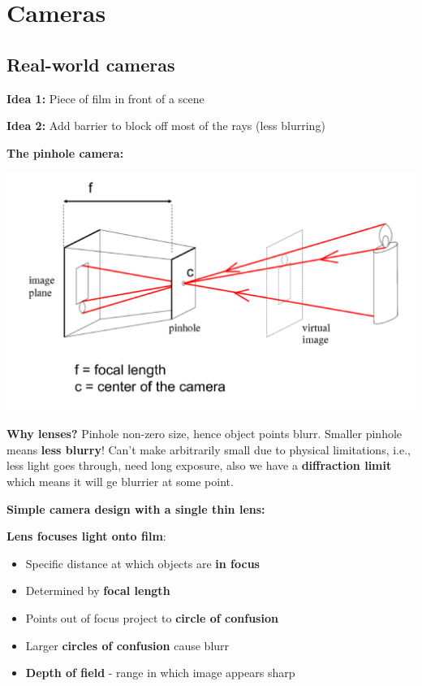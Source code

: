 \chapter{Cameras}

\section{Real-world cameras}

\textbf{Idea 1:} Piece of film in front of a scene

\textbf{Idea 2:} Add barrier to block off most of the rays (less blurring)

\textbf{The pinhole camera:} 

\includegraphics[width=\textwidth]{images/chap7/pinhole}

\textbf{Why lenses?} Pinhole non-zero size, hence object points blurr. Smaller pinhole means \textbf{less blurry}! Can't make arbitrarily small due to physical limitations, i.e., less light goes through, need long exposure, also we have a \textbf{diffraction limit} which means it will ge blurrier at some point.

\textbf{Simple camera design with a single thin lens:}

\textbf{Lens focuses light onto film}: \begin{itemize}
    \item Specific distance at which objects are \textbf{in focus}
    \item Determined by \textbf{focal length}
    \item Points out of focus project to \textbf{circle of confusion}
    \item Larger \textbf{circles of confusion} cause blurr
    \item \textbf{Depth of field} - range in which image appears sharp
\end{itemize}

